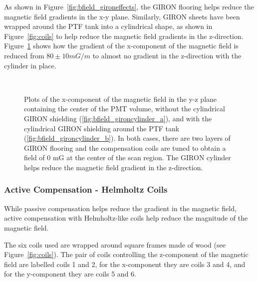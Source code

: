 As shown in Figure~\ref{fig:bfield_gironeffects}, the GIRON flooring helps reduce the magnetic field gradients in the x-y plane. Similarly, GIRON sheets have been wrapped around the PTF tank into a cylindrical shape, as shown in Figure~\ref{fig:coils} to help reduce the magnetic field gradients in the z-direction. Figure~\ref{fig:bfield_gironcylinder} shows how the gradient of the x-component of the magnetic field is reduced from $ 80\pm10 mG/m $ to almost no gradient in the z-direction with the cylinder in place.
%
\begin{figure}[htbp]
  \begin{center}
    \\
    \vspace{-3 mm}
  \caption{Plots of the x-component of the magnetic field in the y-z plane containing the center of the PMT volume, without the cylindrical GIRON shielding (\ref{fig:bfield_gironcylinder_a}), and with the cylindrical GIRON shielding around the PTF tank (\ref{fig:bfield_gironcylinder_b}). In both cases, there are two layers of GIRON flooring and the compensation coils are tuned to obtain a field of 0 mG at the center of the scan region. The GIRON cylinder helps reduce the magnetic field gradient in the z-direction.}
  \label{fig:bfield_gironcylinder}
  \end{center}
\end{figure}
%

\subsubsection{Active Compensation - Helmholtz Coils}

While passive compensation helps reduce the gradient in the magnetic field, active compensation with Helmholtz-like coils help reduce the magnitude of the magnetic field.

The six coils used are wrapped around square frames made of wood (see Figure~\ref{fig:coils}). The pair of coils controlling the z-component of the magnetic field are labelled coils 1 and 2, for the x-component they are coils 3 and 4, and for the y-component they are coils 5 and 6.

